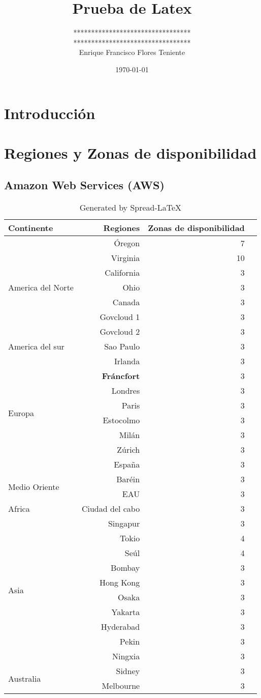 \documentclass{article}
\title{Prueba de Latex}
\date{\today}
\author{
    ********************************* \\
    ********************************* \\
    Enrique Francisco Flores Teniente
  }
\affil{UTEC}
\begin{document}
\maketitle

\section{Introducción}



\section{Regiones y Zonas de disponibilidad}

\subsection{Amazon Web Services (AWS)}

\begin{table}[!htp]\centering
\caption{Generated by Spread-LaTeX}\label{tab: }
\scriptsize
\begin{tabular}{lrrr}\toprule
Continente &Regiones &Zonas de disponibilidad \\\midrule
\multirow{7}{*}{America del Norte} &Óregon &7 \\
&Virginia &10 \\
&California &3 \\
&Ohio &3 \\
&Canada &3 \\
&Govcloud 1 &3 \\
&Govcloud 2 &3 \\
America del sur &Sao Paulo &3 \\
\multirow{8}{*}{Europa} &Irlanda &3 \\
&\textbf{Fráncfort} &3 \\
&Londres &3 \\
&Paris &3 \\
&Estocolmo &3 \\
&Milán &3 \\
&Zúrich &3 \\
&España &3 \\
\multirow{2}{*}{Medio Oriente} &Baréin &3 \\
&EAU &3 \\
Africa &Ciudad del cabo &3 \\
\multirow{10}{*}{Asia} &Singapur &3 \\
&Tokio &4 \\
&Seúl &4 \\
&Bombay &3 \\
&Hong Kong &3 \\
&Osaka &3 \\
&Yakarta &3 \\
&Hyderabad &3 \\
&Pekin &3 \\
&Ningxia &3 \\
\multirow{2}{*}{Australia} &Sidney &3 \\
&Melbourne &3 \\
\bottomrule
\end{tabular}
\end{table}
\end{document}
